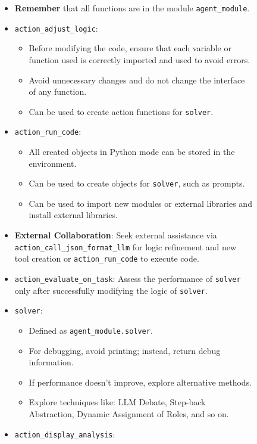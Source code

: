 \begin{figure}[ht]
\begin{tcolorbox}[colback=black!15!white, colframe=black, title=Goal Prompt of \framework]
\begin{itemize}[leftmargin=*,itemsep=1pt]
    \item \textbf{Remember} that all functions are in the module \texttt{agent\_module}.
    \item \texttt{action\_adjust\_logic}:
    \begin{itemize}[leftmargin=*,itemsep=2pt]
        \item Before modifying the code, ensure that each variable or function used is correctly imported and used to avoid errors.
        \item Avoid unnecessary changes and do not change the interface of any function.
        \item Can be used to create action functions for \texttt{solver}.
    \end{itemize}
    \item \texttt{action\_run\_code}:
    \begin{itemize}[leftmargin=*,itemsep=2pt]
        \item All created objects in Python mode can be stored in the environment.
        \item Can be used to create objects for \texttt{solver}, such as prompts.
        \item Can be used to import new modules or external libraries and install external libraries.
    \end{itemize}
    \item \textbf{External Collaboration}: Seek external assistance via \texttt{action\_call\_json\_format\_llm} for logic refinement and new tool creation or \texttt{action\_run\_code} to execute code.
    \item \texttt{action\_evaluate\_on\_task}: Assess the performance of \texttt{solver} only after successfully modifying the logic of \texttt{solver}.
    \item \texttt{solver}:
    \begin{itemize}[leftmargin=*,itemsep=1pt]
        \item Defined as \texttt{agent\_module.solver}.
        \item For debugging, avoid printing; instead, return debug information.
        \item If performance doesn't improve, explore alternative methods.
        \item Explore techniques like: LLM Debate, Step-back Abstraction, Dynamic Assignment of Roles, and so on.
    \end{itemize}
    \item \texttt{action\_display\_analysis}:

\end{itemize}
\end{tcolorbox}
\end{figure}
